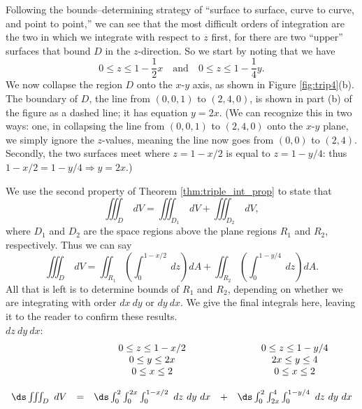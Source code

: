 {Following the bounds--determining strategy of ``surface to surface, curve to curve, and point to point,''  we can see that the most difficult orders of integration are the two in which we integrate with respect to $z$ first, for there are two ``upper'' surfaces that bound $D$ in the $z$-direction. So we start by noting that we have 
$$0\leq z\leq 1-\frac12x \quad\text{and}\quad 0\leq z\leq 1-\frac14y.$$
We now collapse the region $D$ onto the $x$-$y$ axis, as shown in Figure \ref{fig:trip4}(b). The boundary of $D$, the line from $(0,0,1)$ to $(2,4,0)$, is shown in part (b) of the figure as a dashed line; it has equation $y=2x$. (We can recognize this in two ways: one, in collapsing the line from $(0,0,1)$ to $(2,4,0)$ onto the $x$-$y$ plane, we simply ignore the $z$-values, meaning the line now goes from $(0,0)$ to $(2,4)$. Secondly, the two surfaces meet where $z=1-x/2$ is equal to $z=1-y/4$: thus $1-x/2=1-y/4 \Rightarrow y=2x.$)

We use the second property of Theorem \ref{thm:triple_int_prop} to state that 
$$\iiint_D \ dV = \iiint_{D_1}\ dV + \iiint_{D_2}\ dV,$$
where $D_1$ and $D_2$ are the space regions above the plane regions $R_1$ and $R_2$, respectively. Thus we can say
$$\iiint_D\ dV = \iint_{R_1}\left(\int_0^{1-x/2}\ dz\right)dA + \iint_{R_2}\left(\int_0^{1-y/4}\ dz\right)dA.$$
All that is left is to determine bounds of $R_1$ and $R_2$, depending on whether we are integrating with order $dx\ dy$ or $dy\ dx$. We give the final integrals here, leaving it to the reader to confirm these results.\\

\noindent $dz\ dy\ dx$:
$$\begin{array}{ccccc}
		& &\begin{array}{c}
		0\leq z\leq 1-x/2\\
		0\leq y\leq 2x\\
		0\leq x\leq 2
		\end{array} 
		& &
		\begin{array}{c}
		0\leq z\leq 1-y/4\\
		2x\leq y\leq 4\\
		0\leq x\leq 2
		\end{array}\\
		\\
		\ds \iiint_D\ dV &=& \ds \int_0^2\int_0^{2x}\int_0^{1-x/2}\ dz\ dy\ dx &+&\ds \int_0^2\int_{2x}^4\int_0^{1-y/4}\ dz\ dy\ dx
	\end{array}
$$\\

}
